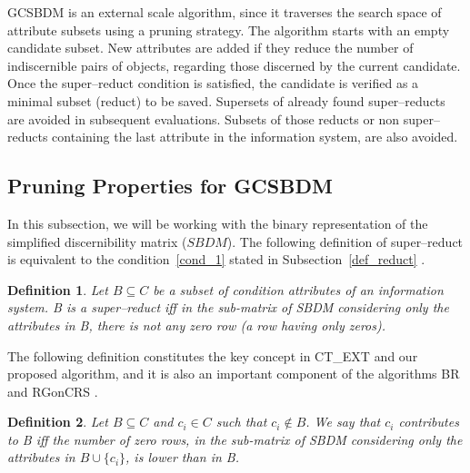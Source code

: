 \documentclass[authoryear,preprint,review,12pt]{elsarticle}
\newtheorem{definition}{Definition}
\begin{document}
  GCSBDM is an external scale algorithm, since it traverses the search space of attribute subsets using a pruning strategy. The algorithm starts with an empty candidate subset. New attributes are added if they reduce the number of indiscernible pairs of objects, regarding those discerned by the current candidate. Once the super--reduct condition is satisfied, the candidate is verified as a minimal subset (reduct) to be saved. Supersets of already found super--reducts are avoided in subsequent evaluations. Subsets of those reducts or non super--reducts containing the last attribute in the information system, are also avoided.
  
\subsection{Pruning Properties for GCSBDM}\label{properties}
	In this subsection, we will be working with the binary representation of the simplified discernibility matrix
	($SBDM$). The following definition of super--reduct is equivalent to the condition~\ref{cond_1} stated in 
	Subsection~\ref{def_reduct} \citep{Lazo15}.
	
	\begin{definition}\label{def:testor}
		Let $B \subseteq C$ be a subset of condition attributes of an information system. B is a super--reduct 
		iff in the sub-matrix of SBDM considering only the attributes in B, there is not any zero row (a row 
		having only zeros).
	\end{definition}
	
	The following definition constitutes the key concept in CT\_EXT \citep{Sanchez07} and our proposed algorithm,
	and it is also an important component of the algorithms BR \citep{Lias09} and RGonCRS
	\citep{WangP07}.
		
	\begin{definition}\label{def:contrib}
		Let $B \subseteq C$ and  $c_i \in C$ such that $c_i \notin B$. We say that $c_i$ contributes to B iff the
		number of zero rows, in the sub-matrix of SBDM considering only the attributes in 
		$B\cup\{c_i\}$, is lower than in B.
	\end{definition}		
		
\end{document}
